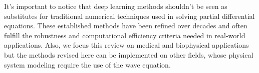 \documentclass{tufte-handout}
\begin{document}
It's important to notice that deep learning methods shouldn't be seen as substitutes for traditional numerical techniques used in solving partial differential equations. These established methods have been refined over decades and often fulfill the robustness and computational efficiency criteria needed in real-world applications. Also, we focus this review on medical and biophysical applications but the methods revised here can be implemented on other fields, whose physical system modeling require the use of the wave equation. 




\end{document}

